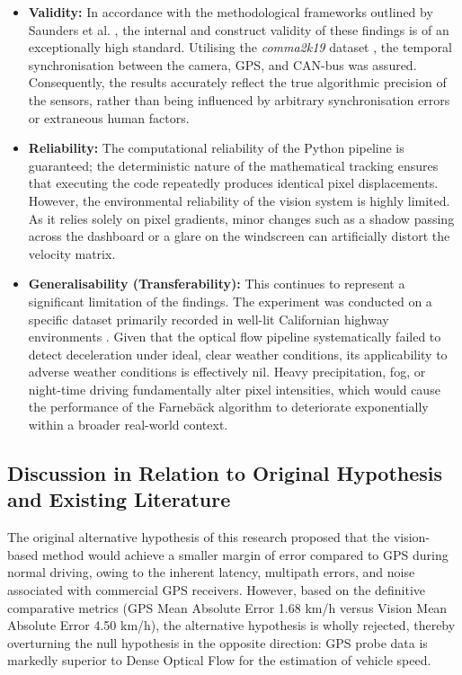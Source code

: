\begin{itemize}
    \item \textbf{Validity:} In accordance with the methodological frameworks outlined by Saunders et al. \cite{saunders2019research}, the internal and construct validity of these findings is of an exceptionally high standard. Utilising the \textit{comma2k19} dataset \cite{schafer2018commute}, the temporal synchronisation between the camera, GPS, and CAN-bus was assured. Consequently, the results accurately reflect the true algorithmic precision of the sensors, rather than being influenced by arbitrary synchronisation errors or extraneous human factors.
    \item \textbf{Reliability:} The computational reliability of the Python pipeline is guaranteed; the deterministic nature of the mathematical tracking ensures that executing the code repeatedly produces identical pixel displacements. However, the environmental reliability of the vision system is highly limited. As it relies solely on pixel gradients, minor changes such as a shadow passing across the dashboard or a glare on the windscreen can artificially distort the velocity matrix.
    \item \textbf{Generalisability (Transferability):} This continues to represent a significant limitation of the findings. The experiment was conducted on a specific dataset primarily recorded in well-lit Californian highway environments \cite{schafer2018commute}. Given that the optical flow pipeline systematically failed to detect deceleration under ideal, clear weather conditions, its applicability to adverse weather conditions is effectively nil. Heavy precipitation, fog, or night-time driving fundamentally alter pixel intensities, which would cause the performance of the Farnebäck algorithm to deteriorate exponentially within a broader real-world context.
\end{itemize}

\subsection{Discussion in Relation to Original Hypothesis and Existing Literature}
The original alternative hypothesis of this research proposed that the vision-based method would achieve a smaller margin of error compared to GPS during normal driving, owing to the inherent latency, multipath errors, and noise associated with commercial GPS receivers. However, based on the definitive comparative metrics (GPS Mean Absolute Error 1.68 km/h versus Vision Mean Absolute Error 4.50 km/h), the alternative hypothesis is wholly rejected, thereby overturning the null hypothesis in the opposite direction: GPS probe data is markedly superior to Dense Optical Flow for the estimation of vehicle speed.

